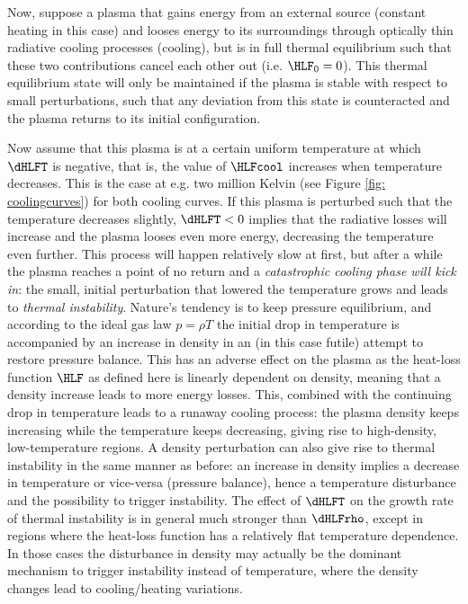 Now, suppose a plasma that gains energy from an external source (constant heating in this case) and looses energy to its surroundings through optically thin radiative cooling processes (cooling), but is in full thermal equilibrium such that these two contributions cancel each other out (i.e. $\HLF_0 = 0$). This thermal equilibrium state will only be maintained if the plasma is stable with respect to small perturbations, such that any deviation from this state is counteracted and the plasma returns to its initial configuration.

Now assume that this plasma is at a certain uniform temperature at which $\dHLFT$ is negative, that is, the value of $\HLFcool$ increases when temperature decreases. This is the case at e.g. two million Kelvin (see Figure \ref{fig: coolingcurves}) for both cooling curves. If this plasma is perturbed such that the temperature decreases slightly, $\dHLFT < 0$ implies that the radiative losses will increase and the plasma looses even more energy, decreasing the temperature even further. This process will happen relatively slow at first, but after a while the plasma reaches a point of no return and a \emph{catastrophic cooling phase will kick in}: the small, initial perturbation that lowered the temperature grows and leads to \emph{thermal instability}. Nature's tendency is to keep pressure equilibrium, and according to the ideal gas law $p = \rho T$ the initial drop in temperature is accompanied by an increase in density in an (in this case futile) attempt to restore pressure balance. This has an adverse effect on the plasma as the heat-loss function $\HLF$ as defined here is linearly dependent on density, meaning that a density increase leads to more energy losses. This, combined with the continuing drop in temperature leads to a runaway cooling process: the plasma density keeps increasing while the temperature keeps decreasing, giving rise to high-density, low-temperature regions.
A density perturbation can also give rise to thermal instability in the same manner as before: an increase in density implies a decrease in temperature or vice-versa (pressure balance), hence a temperature disturbance and the possibility to trigger instability. The effect of $\dHLFT$ on the growth rate of thermal instability is in general much stronger than $\dHLFrho$, except in regions where the heat-loss function has a relatively flat temperature dependence. In those cases the disturbance in density may actually be the dominant mechanism to trigger instability instead of temperature, where the density changes lead to cooling/heating variations.

